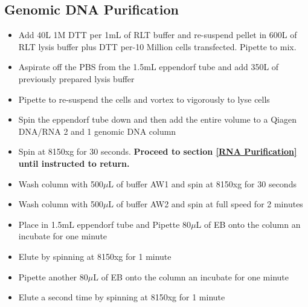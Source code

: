 \documentclass[a4paper]{article}
\begin{document}
    
    \subsection{Genomic DNA Purification}\label{Genomic Purification}
    	\begin{itemize}
        	
            \item Add 40\textmu L 1M DTT per 1mL of RLT buffer and re-suspend pellet in 600\textmu L of RLT lysis buffer plus DTT per-10 Million cells transfected. Pipette to mix.
            
        	\item Aspirate off the PBS from the 1.5mL eppendorf tube and add 350\textmu L of previously prepared lysis buffer 
            
            \item Pipette to re-suspend the cells and vortex to vigorously to lyse cells
            
            \item Spin the eppendorf tube down and then add the entire volume to a Qiagen DNA/RNA 2 and 1 genomic DNA column
            
            \item Spin at 8150xg for 30 seconds. \textbf{Proceed to section \ref{RNA Purification} until instructed to return.}
            
            \item Wash column with 500$\mu$L of buffer AW1 and spin at 8150xg for 30 seconds
            
            \item Wash column with 500$\mu$L of buffer AW2 and spin at full speed for 2 minutes
            
            \item Place in 1.5mL eppendorf tube and Pipette 80$\mu$L of EB onto the column an incubate for one minute 
            
            \item Elute by spinning at 8150xg for 1 minute
            
            \item Pipette another 80$\mu$L of EB onto the column an incubate for one minute
            
            \item Elute a second time by spinning at 8150xg for 1 minute
            
        \end{itemize}
    
\end{document}
